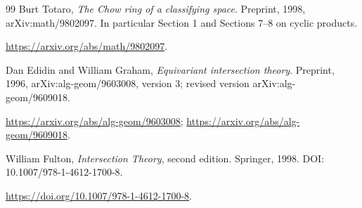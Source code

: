 \documentclass[11pt,a4paper]{article}
\theoremstyle{definition}
\theoremstyle{remark}
\begin{document}
\begin{thebibliography}{99}
Burt Totaro,
\emph{The Chow ring of a classifying space}.
Preprint, 1998, arXiv:math/9802097. In particular Section 1 and
Sections 7--8 on cyclic products.\par
\url{https://arxiv.org/abs/math/9802097}.

Dan Edidin and William Graham,
\emph{Equivariant intersection theory}.
Preprint, 1996, arXiv:alg-geom/9603008, version 3;
revised version arXiv:alg-geom/9609018.\par
\url{https://arxiv.org/abs/alg-geom/9603008};
\url{https://arxiv.org/abs/alg-geom/9609018}.

William Fulton,
\emph{Intersection Theory}, second edition.
Springer, 1998. DOI: 10.1007/978-1-4612-1700-8.\par
\url{https://doi.org/10.1007/978-1-4612-1700-8}.

\end{thebibliography}
\end{document}
